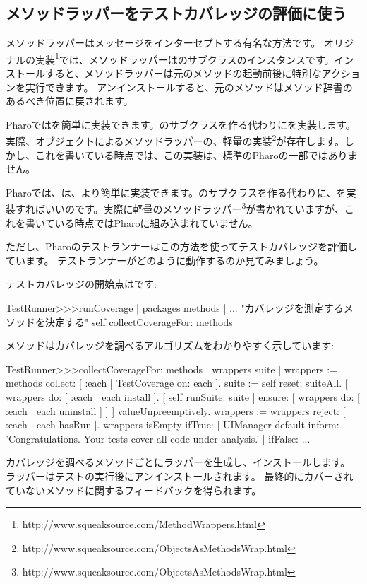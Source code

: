 \documentclass[a4paper,10pt,twoside]{book}
\begin{document}
\subsection{メソッドラッパーをテストカバレッジの評価に使う}

メソッドラッパーはメッセージをインターセプトする有名な方法です\cite{Bran98a}。
オリジナルの実装\footnote{http://www.squeaksource.com/MethodWrappers.html}では、メソッドラッパーはのサブクラスのインスタンスです。インストールすると、メソッドラッパーは元のメソッドの起動前後に特別なアクションを実行できます。
アンインストールすると、元のメソッドはメソッド辞書のあるべき位置に戻されます。

Pharoではを簡単に実装できます。のサブクラスを作る代わりにを実装します。実際、オブジェクトによるメソッドラッパーの、軽量の実装\footnote{http://www.squeaksource.com/ObjectsAsMethodsWrap.html}が存在します。しかし、これを書いている時点では、この実装は、標準のPharoの一部ではありません。

Pharoでは、は、より簡単に実装できます。のサブクラスを作る代わりに、を実装すればいいのです。実際に軽量のメソッドラッパー\footnote{http://www.squeaksource.com/ObjectsAsMethodsWrap.html}が書かれていますが、これを書いている時点ではPharoに組み込まれていません。

ただし、Pharoのテストランナーはこの方法を使ってテストカバレッジを評価しています。
テストランナーがどのように動作するのか見てみましょう。

テストカバレッジの開始点はです:
\begin{code}{}
TestRunner>>>runCoverage
	| packages methods |
	... "カバレッジを測定するメソッドを決定する"
	self collectCoverageFor: methods
\end{code}

メソッドはカバレッジを調べるアルゴリズムをわかりやすく示しています:
\begin{code}{}
TestRunner>>>collectCoverageFor: methods
	| wrappers suite |
	wrappers := methods collect: [ :each | TestCoverage on: each ].
	suite := self
		reset;
		suiteAll.
	[ wrappers do: [ :each | each install ].
	  [ self runSuite: suite ] ensure: [ wrappers do: [ :each | each uninstall ] ] ] valueUnpreemptively.
	wrappers := wrappers reject: [ :each | each hasRun ].
	wrappers isEmpty 
		ifTrue: 
			[ UIManager default inform: 'Congratulations. Your tests cover all code under analysis.' ]
		ifFalse: ...
\end{code}
カバレッジを調べるメソッドごとにラッパーを生成し、インストールします。
ラッパーはテストの実行後にアンインストールされます。
最終的にカバーされていないメソッドに関するフィードバックを得られます。
\end{document}
